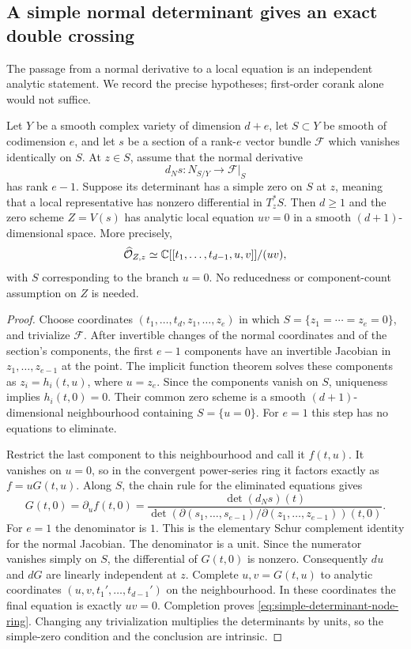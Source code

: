 \subsection{A simple normal determinant gives an exact double crossing}
\label{sec:simple-normal-determinant}
The passage from a normal derivative to a local equation is an
independent analytic statement. We record the precise hypotheses;
first-order corank alone would not suffice.

\begin{lemma}\label{lem:simple-normal-determinant}
Let $Y$ be a smooth complex variety of dimension $d+e$, let
$S\subset Y$ be smooth of codimension $e$, and let $s$ be a section
of a rank-$e$ vector bundle $\mathcal F$ which vanishes identically
on $S$. At $z\in S$, assume that the normal derivative
\[
 d_Ns:N_{S/Y}\longrightarrow\mathcal F|_S
\]
has rank $e-1$. Suppose its determinant has a simple zero on $S$
at $z$, meaning that a local representative has nonzero differential
in $T_z^*S$. Then $d\ge1$ and the zero scheme $Z=V(s)$ has analytic
local equation $uv=0$ in a smooth $(d+1)$-dimensional space. More
precisely,
\begin{equation}\label{eq:simple-determinant-node-ring}
 \widehat{\mathcal O}_{Z,z}\simeq
 \mathbb C[[t_1,\ldots,t_{d-1},u,v]]/(uv),
\end{equation}
with $S$ corresponding to the branch $u=0$. No reducedness or
component-count assumption on $Z$ is needed.
\end{lemma}
\begin{proof}
Choose coordinates $(t_1,\ldots,t_d,z_1,\ldots,z_e)$ in which
$S=\{z_1=\cdots=z_e=0\}$, and trivialize $\mathcal F$.
After invertible changes of the normal coordinates and of the
section's components, the first $e-1$ components have an invertible
Jacobian in $z_1,\ldots,z_{e-1}$ at the point. The implicit function
theorem solves these components as
$z_i=h_i(t,u)$, where $u=z_e$. Since the components vanish on $S$,
uniqueness implies $h_i(t,0)=0$. Their common zero scheme is a smooth
$(d+1)$-dimensional neighbourhood containing $S=\{u=0\}$.
For $e=1$ this step has no equations to eliminate.

Restrict the last component to this neighbourhood and call it
$f(t,u)$. It vanishes on $u=0$, so in the convergent power-series
ring it factors exactly as $f=uG(t,u)$. Along $S$, the chain rule
for the eliminated equations gives
\[
 G(t,0)=\partial_u f(t,0)
 =\frac{\det(d_Ns)(t)}{
    \det(\partial(s_1,\ldots,s_{e-1})/
                    \partial(z_1,\ldots,z_{e-1}))(t,0)}.
\]
For $e=1$ the denominator is $1$. This is the elementary Schur
complement identity for the normal Jacobian. The denominator is a
unit. Since the numerator vanishes simply on $S$, the differential
of $G(t,0)$ is nonzero. Consequently $du$ and $dG$ are linearly
independent at $z$. Complete $u,v=G(t,u)$ to analytic coordinates
$(u,v,t_1',\ldots,t_{d-1}')$ on the neighbourhood. In these
coordinates the final equation is exactly $uv=0$. Completion proves
\eqref{eq:simple-determinant-node-ring}. Changing any trivialization
multiplies the determinants by units, so the simple-zero condition
and the conclusion are intrinsic.
\end{proof}


